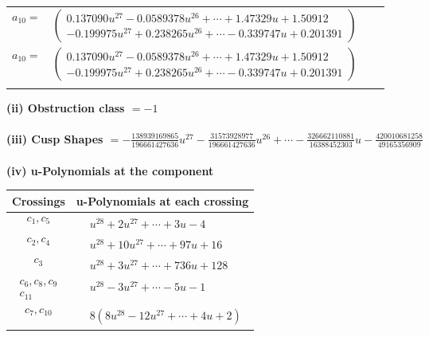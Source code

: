 \documentclass[1p]{elsarticle_modified}
\theoremstyle{definition}
\begin{document}
\begin{tabular}{m{7pt} m{180pt} m{7pt} m{180pt} }
\flushright $a_{10}=$&$\begin{pmatrix}0.137090 u^{27}-0.0589378 u^{26}+\cdots+1.47329 u+1.50912\\-0.199975 u^{27}+0.238265 u^{26}+\cdots-0.339747 u+0.201391\end{pmatrix}$\\ \flushright $a_{10}=$&$\begin{pmatrix}0.137090 u^{27}-0.0589378 u^{26}+\cdots+1.47329 u+1.50912\\-0.199975 u^{27}+0.238265 u^{26}+\cdots-0.339747 u+0.201391\end{pmatrix}$\\&\end{tabular}
\flushleft \textbf{(ii) Obstruction class $= -1$}\\~\\
\flushleft \textbf{(iii) Cusp Shapes $= -\frac{138939169865}{196661427636} u^{27}-\frac{31573928977}{196661427636} u^{26}+\cdots-\frac{326662110881}{16388452303} u-\frac{420010681258}{49165356909}$}\\~\\
\newpage\renewcommand{\arraystretch}{1}
\flushleft \textbf{(iv) u-Polynomials at the component}\newline \\
\begin{tabular}{m{50pt}|m{274pt}}
Crossings & \hspace{64pt}u-Polynomials at each crossing \\
\hline $$\begin{aligned}c_{1},c_{5}\end{aligned}$$&$\begin{aligned}
&u^{28}+2 u^{27}+\cdots+3 u-4
\end{aligned}$\\
\hline $$\begin{aligned}c_{2},c_{4}\end{aligned}$$&$\begin{aligned}
&u^{28}+10 u^{27}+\cdots+97 u+16
\end{aligned}$\\
\hline $$\begin{aligned}c_{3}\end{aligned}$$&$\begin{aligned}
&u^{28}+3 u^{27}+\cdots+736 u+128
\end{aligned}$\\
\hline $$\begin{aligned}c_{6},c_{8},c_{9}\\c_{11}\end{aligned}$$&$\begin{aligned}
&u^{28}-3 u^{27}+\cdots-5 u-1
\end{aligned}$\\
\hline $$\begin{aligned}c_{7},c_{10}\end{aligned}$$&$\begin{aligned}
&8(8 u^{28}-12 u^{27}+\cdots+4 u+2)
\end{aligned}$\\
\hline
\end{tabular}\\~\\
\end{document}
